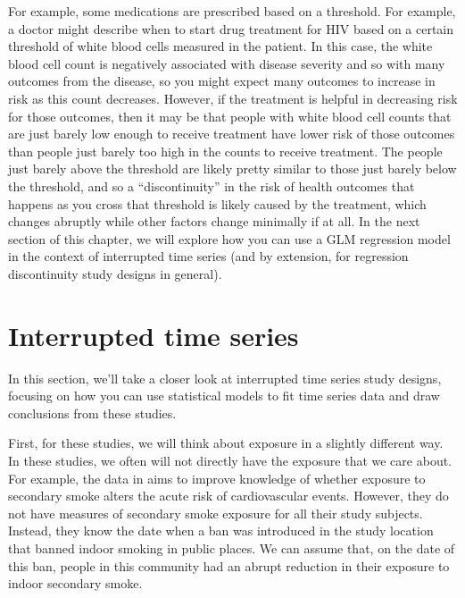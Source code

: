 \documentclass[
]{book}
\begin{document}
For example, some medications are prescribed based on a threshold. For example, a doctor might describe when to start drug treatment for HIV based on a certain threshold of white blood cells measured in the patient. In this case, the white blood cell count is negatively associated with disease severity and so with many outcomes from the disease, so you might expect many outcomes to increase in risk as this count decreases. However, if the treatment is helpful in decreasing risk for those outcomes, then it may be that people with white blood cell counts that are just barely low enough to receive treatment have lower risk of those outcomes than people just barely too high in the counts to receive treatment. The people just barely above the threshold are likely pretty similar to those just barely below the threshold, and so a ``discontinuity'' in the risk of health outcomes that happens as you cross that threshold is likely caused by the treatment, which changes abruptly while other factors change minimally if at all. In the next section of this chapter, we will explore how you can use a GLM regression model in the context of interrupted time series (and by extension, for regression discontinuity study designs in general).

\section{Interrupted time series}\label{interrupted-time-series}

In this section, we'll take a closer look at interrupted time series study designs, focusing on how you can use statistical models to fit time series data and draw conclusions from these studies.

First, for these studies, we will think about exposure in a slightly different way. In these studies, we often will not directly have the exposure that we care about. For example, the data in \citet{bernal2017interrupted} aims to improve knowledge of whether exposure to secondary smoke alters the acute risk of cardiovascular events. However, they do not have measures of secondary smoke exposure for all their study subjects. Instead, they know the date when a ban was introduced in the study location that banned indoor smoking in public places. We can assume that, on the date of this ban, people in this community had an abrupt reduction in their exposure to indoor secondary smoke.
\end{document}
